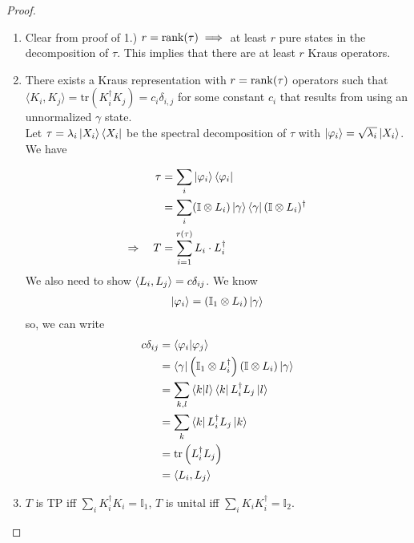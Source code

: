 \documentclass[../../note.tex]{subfiles}
\begin{document}
\begin{tcolorbox}[colframe=black,breakable, colback=black!5, arc=0pt, outer arc=0pt,boxrule=0.5pt]
\begin{proof}
\begin{enumerate}
    
    
    \item Clear from proof of 1.) $r=\operatorname{rank}(\tau) \implies$ at least $r$ pure states in the decomposition of $\tau$. This implies that there are at least $r$ Kraus operators. 
    \item There exists a Kraus representation with $r=\operatorname{rank}(\tau)$ operators such that $\langle K_i,K_j\rangle=\text{tr}(K_i^{\dagger} K_j) = c_i \delta_{i,j}$ for some constant $c_i$ that results from using an unnormalized $\gamma$ state. \\
    
    Let $\tau = \lambda_i \ket{X_i} \bra{X_i}$ be the spectral decomposition of $\tau$ with $\ket{\varphi_i}=\sqrt{\lambda_i} \ket{X_i}$. We have
    
    \begin{align}
        \tau &= \sum_i \ket{\varphi_i}\bra{\varphi_i} \\
        &=\sum_i (\mathbb{I} \otimes L_i) \ket{\gamma}\bra{\gamma} (\mathbb{I}\otimes L_i)^{\dagger} \\
        \Rightarrow \quad  T &= \sum_{i=1}^{r(\tau)}L_i \cdot L_i^{\dagger}
    \end{align}
    We also need to show $\braket{L_i,L_j}=c \delta_{ij}$. We know
    \begin{align}
       \ket{\varphi_i} = (\mathbb{I}_1 \otimes L_i)\ket{\gamma}
    \end{align}
    so, we can write
    \begin{align}
      c\delta_{ij} &=\braket{\varphi_i|\varphi_j}\\
      &= \bra{\gamma}\left(\mathbb{I}_1 \otimes L_i^{\dagger}\right)\left(\mathbb{I}\otimes L_i\right)\ket{\gamma} \\
        &= \sum_{k,l} \braket{k|l} \bra{k}L_i^{\dagger} L_j \ket{l}\\
        &= \sum_k  \bra{k} L_i^{\dagger}L_j \ket{k} \\
        &= \text{tr}\left(L_i^{\dagger} L_j\right)\\
        &= \braket{L_i,L_j}
    \end{align}
    
    \item $T$ is TP iff $\sum_i K_i^{\dagger}K_i = \mathbb{I}_1$, $T$ is unital iff $\sum_i K_i K_i^{\dagger} = \mathbb{I}_2$.
    

\end{enumerate}
\end{proof}
\end{tcolorbox}
\end{document}
